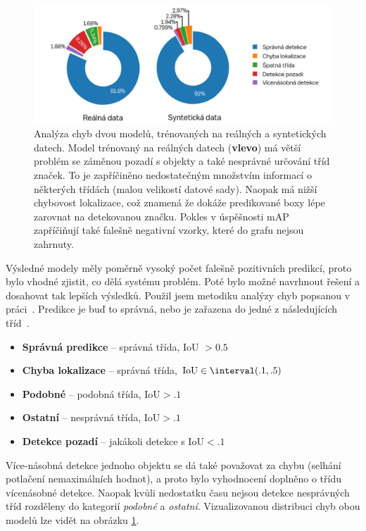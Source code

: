 \documentclass[czech]{ExcelAtFIT} %
\begin{document}
\begin{figure}[t!]\centering
    \centering
    \includegraphics[width=0.90\linewidth]{images/error_analysis.pdf}
    \caption{Analýza chyb dvou modelů, trénovaných na reálných a syntetických datech. Model trénovaný na reálných datech (\textbf{vlevo}) má větší problém se záměnou pozadí s objekty a také nesprávné určování tříd značek. To je zapříčiněno nedostatečným množstvím informací o  některých třídách (malou velikostí datové sady). Naopak má nižší chybovost lokalizace, což znamená že dokáže predikované boxy lépe zarovnat na detekovanou značku. Pokles v úspěšnosti mAP zapříčiňují také falešně negativní vzorky, které do grafu nejsou zahrnuty.}
    \label{fig:analyzaChyb}
\end{figure}

Výsledné modely měly poměrně vysoký počet falešně pozitivních predikcí, proto bylo vhodné zjistit, co dělá systému problém. Poté bylo možné navrhnout řešení a dosahovat tak lepších výsledků. Použil jsem metodiku analýzy chyb popsanou v práci~\cite{errorAnalysis}. Predikce je buď to správná, nebo je zařazena do jedné z následujících tříd~\cite{yolov1}.

\begin{itemize}
    \item \textbf{Správná predikce} -- správná třída, IoU $> 0.5$
    \item \textbf{Chyba lokalizace} -- správná třída, $\text{IoU} \in \interval({.1,.5})$
    \item \textbf{Podobné} -- podobná třída, $\text{IoU} > .1$
    \item \textbf{Ostatní} -- nesprávná třída, $\text{IoU} > .1$
    \item \textbf{Detekce pozadí} -- jakákoli detekce s $\text{IoU} < .1$
\end{itemize}

Více-násobná detekce jednoho objektu se dá také považovat za chybu (selhání potlačení nemaximálních hodnot), a proto bylo vyhodnocení doplněno o třídu vícenásobné detekce. Naopak kvůli nedostatku času nejsou detekce nesprávných tříd rozděleny do kategorií \emph{podobné} a \emph{ostatní}. Vizualizovanou distribuci chyb obou modelů lze vidět na obrázku \ref{fig:analyzaChyb}.
\end{document}
